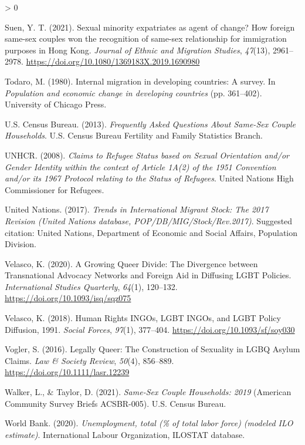 \documentclass[
  11pt,
]{article}
\newlength{\cslhangindent}
\newenvironment{CSLReferences}[2] %
 {%
  \setlength{\parindent}{0pt}
  \ifodd #1 \everypar{\setlength{\hangindent}{\cslhangindent}}\ignorespaces\fi
  \ifnum #2 > 0
  \setlength{\parskip}{#2\baselineskip}
  \fi
 }%
 {}
\begin{document}
\begin{CSLReferences}{1}{0}
\leavevmode\hypertarget{ref-suen_2021_sexual}{}%
Suen, Y. T. (2021). Sexual minority expatriates as agent of change? {How} foreign same-sex couples won the recognition of same-sex relationship for immigration purposes in {Hong Kong}. \emph{Journal of Ethnic and Migration Studies}, \emph{47}(13), 2961--2978. \url{https://doi.org/10.1080/1369183X.2019.1690980}

\leavevmode\hypertarget{ref-todaro_1980}{}%
Todaro, M. (1980). Internal migration in developing countries: A survey. In \emph{Population and economic change in developing countries} (pp. 361--402). {University of Chicago Press}.

\leavevmode\hypertarget{ref-u.s.censusbureau_2013}{}%
U.S. Census Bureau. (2013). \emph{Frequently {Asked Questions About Same}-{Sex Couple Households}}. {U.S. Census Bureau Fertility and Family Statistics Branch}.

\leavevmode\hypertarget{ref-unhcr_2008}{}%
UNHCR. (2008). \emph{Claims to {Refugee Status} based on {Sexual Orientation} and/or {Gender Identity} within the context of {Article 1A}(2) of the 1951 {Convention} and/or its 1967 {Protocol} relating to the {Status} of {Refugees}}. {United Nations High Commissioner for Refugees}.

\leavevmode\hypertarget{ref-unitednations_2017}{}%
United Nations. (2017). \emph{Trends in {International Migrant Stock}: {The} 2017 {Revision} ({United Nations} database, {POP}/{DB}/{MIG}/{Stock}/{Rev}.2017)}. {Suggested citation: United Nations, Department of Economic and Social Affairs, Population Division}.

\leavevmode\hypertarget{ref-velasco_2020}{}%
Velasco, K. (2020). A {Growing Queer Divide}: {The Divergence} between {Transnational Advocacy Networks} and {Foreign Aid} in {Diffusing LGBT Policies}. \emph{International Studies Quarterly}, \emph{64}(1), 120--132. \url{https://doi.org/10.1093/isq/sqz075}

\leavevmode\hypertarget{ref-velasco_2018}{}%
Velasco, K. (2018). Human {Rights INGOs}, {LGBT INGOs}, and {LGBT Policy Diffusion}, 1991{}. \emph{Social Forces}, \emph{97}(1), 377--404. \url{https://doi.org/10.1093/sf/soy030}

\leavevmode\hypertarget{ref-vogler_2016}{}%
Vogler, S. (2016). Legally {Queer}: {The Construction} of {Sexuality} in {LGBQ Asylum Claims}. \emph{Law \& Society Review}, \emph{50}(4), 856--889. \url{https://doi.org/10.1111/lasr.12239}

\leavevmode\hypertarget{ref-walker_2021}{}%
Walker, L., \& Taylor, D. (2021). \emph{Same-{Sex Couple Households}: 2019} (American Community Survey Briefs ACSBR-005). {U.S. Census Bureau}.

\leavevmode\hypertarget{ref-worldbank_2020}{}%
World Bank. (2020). \emph{Unemployment, total (\% of total labor force) (modeled {ILO} estimate)}. {International Labour Organization, ILOSTAT database.}

\end{CSLReferences}
\end{document}
